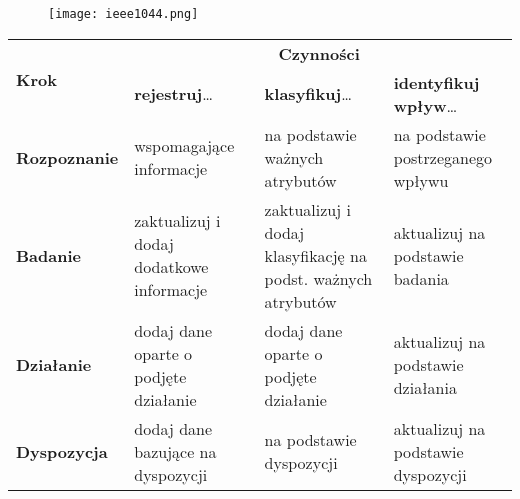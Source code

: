 \documentclass[../main.tex]{subfiles}
\begin{document}
    \begin{figure}[H]
        \texttt{[image: ieee1044.png]}
    \end{figure}


    \begin{table}[H]
        \begin{center}
            \begin{tabular}{ | p{3cm} | p{3cm} | p{3cm} | p{3cm} |}
                \hline
                \multirow{2}{*}{\textbf{Krok}} & \multicolumn{3}{c|}{\textbf{Czynności}}\\
                \cline{2-4}
                \multirow{2}{*}{} & \textbf{rejestruj}\ldots & \textbf{klasyfikuj}\ldots & \textbf{identyfikuj wpływ}\ldots\\
                \hline
                \textbf{Rozpoznanie }& wspomagające informacje
                & na podstawie ważnych atrybutów
                & na podstawie postrzeganego wpływu\\
                \hline
                \textbf{Badanie}
                & zaktualizuj i dodaj dodatkowe informacje
                & zaktualizuj i dodaj klasyfikację na podst. ważnych atrybutów
                & aktualizuj na podstawie badania\\
                \hline
                \textbf{Działanie}
                & dodaj dane oparte o podjęte działanie
                & dodaj dane oparte o podjęte działanie
                & aktualizuj na podstawie działania\\
                \hline
                \textbf{Dyspozycja}
                & dodaj dane bazujące na dyspozycji
                & na podstawie dyspozycji
                & aktualizuj na podstawie dyspozycji\\
                \hline
            \end{tabular}
        \end{center}
    \end{table}
\end{document}

